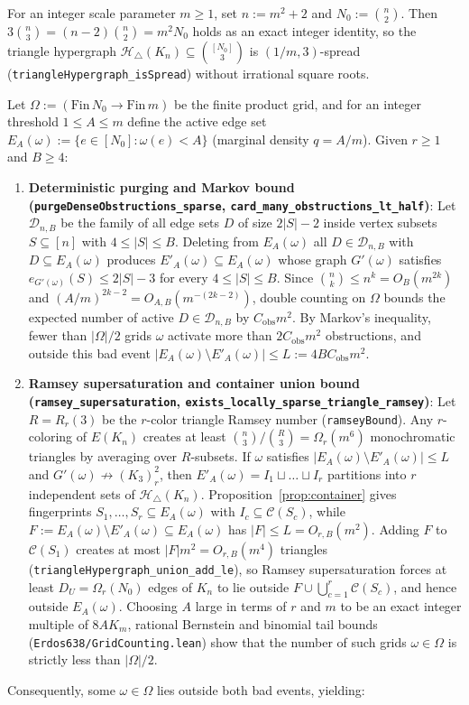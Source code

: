 \documentclass[11pt]{amsart}
\theoremstyle{definition}
\theoremstyle{remark}
\begin{document}
For an integer scale parameter $m \ge 1$, set $n := m^2 + 2$ and $N_0 := \binom{n}{2}$. Then $3\binom{n}{3} = (n - 2)\binom{n}{2} = m^2 N_0$ holds as an exact integer identity, so the triangle hypergraph $\mathcal{H}_\triangle(K_n) \subseteq \binom{[N_0]}{3}$ is $(1/m, 3)$-spread (\texttt{triangleHypergraph\_isSpread}) without irrational square roots.

Let $\Omega := (\mathrm{Fin}\,N_0 \to \mathrm{Fin}\,m)$ be the finite product grid, and for an integer threshold $1 \le A \le m$ define the active edge set $E_A(\omega) := \{e \in [N_0] : \omega(e) < A\}$ (marginal density $q = A/m$). Given $r \ge 1$ and $B \ge 4$:
\begin{enumerate}
  \item \textbf{Deterministic purging and Markov bound (\texttt{purgeDenseObstructions\_sparse}, \texttt{card\_many\_obstructions\_lt\_half})}: Let $\mathcal{D}_{n, B}$ be the family of all edge sets $D$ of size $2|S| - 2$ inside vertex subsets $S \subseteq [n]$ with $4 \le |S| \le B$. Deleting from $E_A(\omega)$ all $D \in \mathcal{D}_{n, B}$ with $D \subseteq E_A(\omega)$ produces $E'_A(\omega) \subseteq E_A(\omega)$ whose graph $G'(\omega)$ satisfies $e_{G'(\omega)}(S) \le 2|S| - 3$ for every $4 \le |S| \le B$. Since $\binom{n}{k} \le n^k = O_B(m^{2k})$ and $(A/m)^{2k-2} = O_{A, B}(m^{-(2k-2)})$, double counting on $\Omega$ bounds the expected number of active $D \in \mathcal{D}_{n, B}$ by $C_{\mathrm{obs}} m^2$. By Markov's inequality, fewer than $|\Omega|/2$ grids $\omega$ activate more than $2 C_{\mathrm{obs}} m^2$ obstructions, and outside this bad event $|E_A(\omega) \setminus E'_A(\omega)| \le L := 4 B C_{\mathrm{obs}} m^2$.
  \item \textbf{Ramsey supersaturation and container union bound (\texttt{ramsey\_supersaturation}, \texttt{exists\_locally\_sparse\_triangle\_ramsey})}: Let $R = R_r(3)$ be the $r$-color triangle Ramsey number (\texttt{ramseyBound}). Any $r$-coloring of $E(K_n)$ creates at least $\binom{n}{3}/\binom{R}{3} = \Omega_r(m^6)$ monochromatic triangles by averaging over $R$-subsets. If $\omega$ satisfies $|E_A(\omega) \setminus E'_A(\omega)| \le L$ and $G'(\omega) \not\to (K_3)^2_r$, then $E'_A(\omega) = I_1 \sqcup \dots \sqcup I_r$ partitions into $r$ independent sets of $\mathcal{H}_\triangle(K_n)$. Proposition~\ref{prop:container} gives fingerprints $S_1, \dots, S_r \subseteq E_A(\omega)$ with $I_c \subseteq \mathcal{C}(S_c)$, while $F := E_A(\omega) \setminus E'_A(\omega) \subseteq E_A(\omega)$ has $|F| \le L = O_{r, B}(m^2)$. Adding $F$ to $\mathcal{C}(S_1)$ creates at most $|F| m^2 = O_{r, B}(m^4)$ triangles (\texttt{triangleHypergraph\_union\_add\_le}), so Ramsey supersaturation forces at least $D_U = \Omega_r(N_0)$ edges of $K_n$ to lie outside $F \cup \bigcup_{c=1}^r \mathcal{C}(S_c)$, and hence outside $E_A(\omega)$. Choosing $A$ large in terms of $r$ and $m$ to be an exact integer multiple of $8 A K_m$, rational Bernstein and binomial tail bounds (\texttt{Erdos638/GridCounting.lean}) show that the number of such grids $\omega \in \Omega$ is strictly less than $|\Omega|/2$.
\end{enumerate}
Consequently, some $\omega \in \Omega$ lies outside both bad events, yielding:
\end{document}
